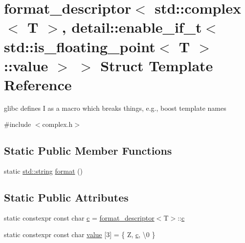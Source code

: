 \hypertarget{structformat__descriptor_3_01std_1_1complex_3_01_t_01_4_00_01detail_1_1enable__if__t_3_01std_1_183b0c7485f88e97534b116276abc2578}{}\section{format\+\_\+descriptor$<$ std\+::complex$<$ T $>$, detail\+::enable\+\_\+if\+\_\+t$<$ std\+::is\+\_\+floating\+\_\+point$<$ T $>$\+::value $>$ $>$ Struct Template Reference}
\label{structformat__descriptor_3_01std_1_1complex_3_01_t_01_4_00_01detail_1_1enable__if__t_3_01std_1_183b0c7485f88e97534b116276abc2578}


glibc defines I as a macro which breaks things, e.\+g., boost template names  




{\ttfamily \#include $<$complex.\+h$>$}

\subsection*{Static Public Member Functions}
\begin{DoxyCompactItemize}
\item 
static \mbox{\hyperlink{_s_d_l__opengl__glext_8h_ab4ccfaa8ab0e1afaae94dc96ef52dde1}{std\+::string}} \mbox{\hyperlink{structformat__descriptor_3_01std_1_1complex_3_01_t_01_4_00_01detail_1_1enable__if__t_3_01std_1_183b0c7485f88e97534b116276abc2578_a533c13d21f493e2487e71b050dff7880}{format}} ()
\end{DoxyCompactItemize}
\subsection*{Static Public Attributes}
\begin{DoxyCompactItemize}
\item 
static constexpr const char \mbox{\hyperlink{structformat__descriptor_3_01std_1_1complex_3_01_t_01_4_00_01detail_1_1enable__if__t_3_01std_1_183b0c7485f88e97534b116276abc2578_a74e39321187d6c907a33df5d6a4b2107}{c}} = \mbox{\hyperlink{structformat__descriptor}{format\+\_\+descriptor}}$<$T$>$\+::\mbox{\hyperlink{_s_d_l__opengl__glext_8h_a1f2d7f8147412c43ba2303a56f97ee73}{c}}
\item 
static constexpr const char \mbox{\hyperlink{structformat__descriptor_3_01std_1_1complex_3_01_t_01_4_00_01detail_1_1enable__if__t_3_01std_1_183b0c7485f88e97534b116276abc2578_a4513779a7903e6be4448f8eb3c3c7f4c}{value}} \mbox{[}3\mbox{]} = \{ \textquotesingle{}Z\textquotesingle{}, \mbox{\hyperlink{_s_d_l__opengl__glext_8h_a1f2d7f8147412c43ba2303a56f97ee73}{c}}, \textquotesingle{}\textbackslash{}0\textquotesingle{} \}
\end{DoxyCompactItemize}



